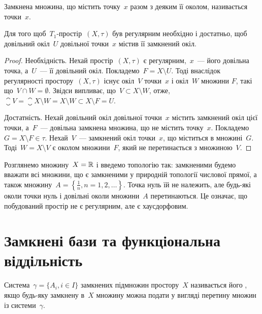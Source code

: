 \begin{definition}
Замкнена множина, що містить точку~$x$
разом з деяким її околом, називається 
точки~$x$.
\end{definition}

\begin{theorem}
Для того щоб~$T_1$-простір~$(X, \tau)$ був регулярним необхідно і достатньо,
щоб довільний окіл~$U$ довільної точки~$x$ містив її
замкнений окіл.
\end{theorem}

\begin{proof}
Необхідність. Нехай простір~$(X, \tau)$ є
регулярним,~$x$~--- його довільна точка, а~$U$~--- її довільний
окіл. Покладемо~$F = X \setminus U$. Тоді внаслідок регулярності
простору~$(X, \tau)$ існує окіл~$V$ точки~$x$ і окіл~$W$ множини
$F$, такі що~$V \cap W = \emptyset$. Звідси випливає, що~$V \subset X \setminus W$,
отже,~$\closure{V} = \closure{X \setminus W} = X \setminus W \subset X \setminus F = U$.

Достатність. Нехай довільний окіл довільної точки~$x$
містить замкнений окіл цієї точки, а~$F$~--- довільна замкнена
множина, що не містить точку~$x$. Покладемо~$G = X \setminus F \in \tau$.
Нехай~$V$~--- замкнений окіл точки~$x$, що міститься в
множині~$G$. Тоді~$W = X \setminus V$ є околом множини~$F$, який не
перетинається з множиною~$V$.
\end{proof}

\begin{example}
Розглянемо множину~$X = \mathbb{R}$ і введемо
топологію так: замкненими будемо вважати всі множини,
що є замкненими у природній топології числової прямої, а
також множину~$A = \left\{ \frac1n, n = 1, 2, \ldots \right\}$.
Точка нуль їй не належить, але будь-які околи точки нуль і довільні околи
множини~$A$ перетинаються. Це означає, що побудований
простір не є регулярним, але є хаусдорфовим.
\end{example}

\section{Замкнені бази та функціональна віддільність}

\begin{definition}
Система~$\gamma = \{ A_i, i \in I\}$ замкнених підмножин
простору~$X$ називається його , якщо будь-яку замкнену
в~$X$ множину можна подати у вигляді перетину множин із системи~$\gamma$.
\end{definition}

